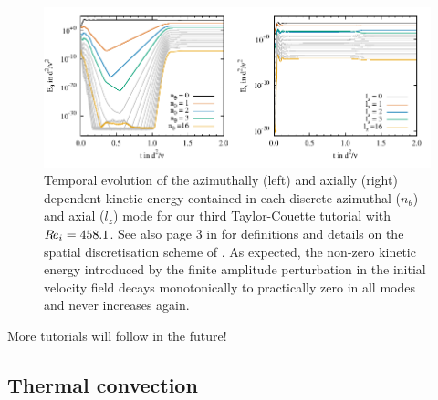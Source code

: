 \documentclass[a4paper, 11pt, DIV=11]{scrartcl}
\begin{document}
\begin{figure}[htb]
\centering
\includegraphics[scale=1.00]{figures/tc0042/keThZ.pdf}
\caption{Temporal evolution of the azimuthally (left) and axially (right)
dependent kinetic energy contained in each discrete azimuthal ($n_{\theta}$)
and axial ($l_{z}$) mode for our third Taylor-Couette tutorial 
with $R\hspace{-0.1em}e_{i}=\num{458.1}$. See also page 3 in \cite{Shi2015} for definitions and
details on the spatial discretisation scheme of \nsc. As expected, the non-zero
kinetic energy introduced by the finite amplitude perturbation in the initial
velocity field decays monotonically to practically zero in all modes and never
increases again.}
\label{fig:tc0042keThZ}
\end{figure}
More tutorials will follow in the future!






\subsection{Thermal convection}
\label{sec:tc0073}
\end{document}
